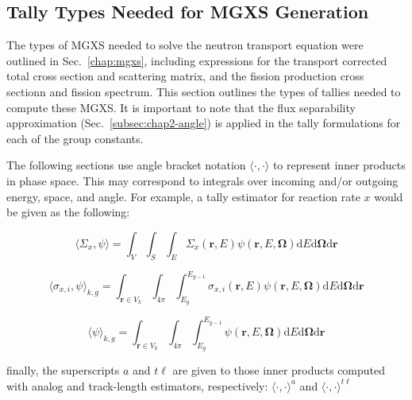 \subsection{Tally Types Needed for \ac{MGXS} Generation}
\label{subsec:chap3-tally-types}

The types of \ac{MGXS} needed to solve the neutron transport equation were outlined in Sec.~\ref{chap:mgxs}, including expressions for the transport corrected total cross section and scattering matrix, and the fission production cross sectionn and fission spectrum. This section outlines the types of tallies needed to compute these \ac{MGXS}. It is important to note that the flux separability approximation (Sec.~\ref{subsec:chap2-angle}) is applied in the tally formulations for each of the group constants.

The following sections use angle bracket notation $\langle \cdot , \cdot \rangle$ to represent inner products in phase space. This may correspond to integrals over incoming and/or outgoing energy, space, and angle. For example, a tally estimator for reaction rate $x$ would be given as the following: 

\begin{equation}
\label{eqn:chap3-inner-prod-notation}
\langle \Sigma_x, \psi \rangle = \int_{V} \int_{S} \int_{E} \Sigma_{x}(\mathbf{r},E)\psi(\mathbf{r},E,\mathbf{\Omega}) \mathrm{d}E\mathrm{d}\mathbf{\Omega}\mathrm{d}\mathbf{r}
\end{equation}

\begin{equation}
\label{eqn:chap3-angle-rxn-rate}
\langle \sigma_{x,i}, \psi \rangle_{k,g} = \int_{\mathbf{r} \in V_{k}} \int_{4\pi} \int_{E_{g}}^{E_{g-1}} \sigma_{x,i}(\mathbf{r},E)\psi(\mathbf{r},E,\mathbf{\Omega}) \mathrm{d}E\mathrm{d}\mathbf{\Omega}\mathrm{d}\mathbf{r}
\end{equation}

\begin{equation}
\label{eqn:chap3-angle-flux}
\langle \psi \rangle_{k,g} = \int_{\mathbf{r} \in V_{k}} \int_{4\pi} \int_{E_{g}}^{E_{g-1}} \psi(\mathbf{r},E,\mathbf{\Omega}) \mathrm{d}E\mathrm{d}\mathbf{\Omega}\mathrm{d}\mathbf{r}
\end{equation}

finally, the superscripts $a$ and $t\ell$ are given to those inner products computed with analog and track-length estimators, respectively: $\langle \cdot,\cdot \rangle^{a}$ and $\langle \cdot,\cdot \rangle^{t\ell}$


